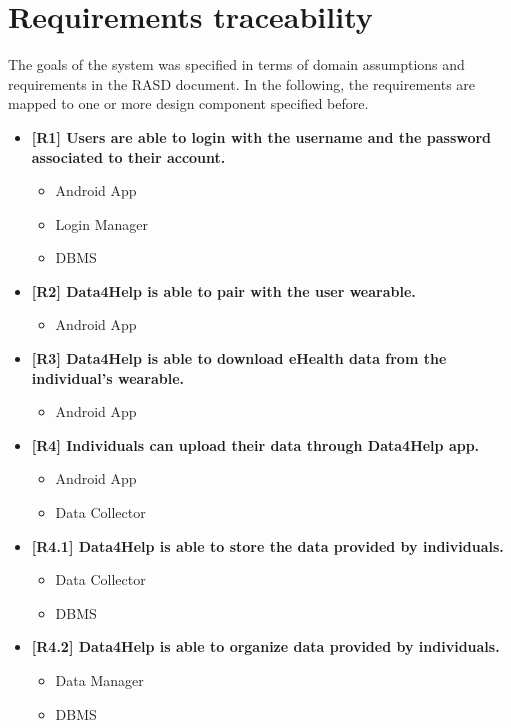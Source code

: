 \chapter{Requirements traceability}\label{c:reqtrace}

The goals of the system was specified in terms of domain assumptions and requirements in the RASD document.
In the following, the requirements are mapped to one or more design component specified before.

\begin{itemize}
\item \textbf{[R1] Users are able to login with the username and the password associated to
their account. }  
\begin{itemize}
\item Android App
\item Login Manager
\item DBMS
\end{itemize}

\item \textbf{[R2] Data4Help is able to pair with the user wearable.}
\begin{itemize}
\item Android App
\end{itemize}

\item \textbf{[R3] Data4Help is able to download eHealth data from the individual’s wearable.}
\begin{itemize}
\item Android App
\end{itemize}

\item \textbf{[R4] Individuals can upload their data through Data4Help app.}
\begin{itemize}
\item Android App
\item Data Collector
\end{itemize}

\item \textbf{[R4.1] Data4Help is able to store the data provided by individuals.}
\begin{itemize}
\item Data Collector
\item DBMS
\end{itemize}

\item \textbf{[R4.2] Data4Help is able to organize data provided by individuals.}
\begin{itemize}
\item Data Manager
\item DBMS
\end{itemize}


\end{itemize}
